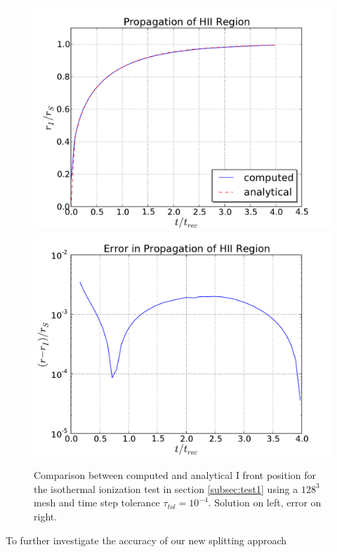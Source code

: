 \begin{figure}[t]
\centerline{\hfill
  \includegraphics[scale=0.45, trim=1.0cm 0.5cm 1.0cm 0.5cm]{i1-rad_vs_time.pdf}
  \includegraphics[scale=0.45, trim=1.0cm 0.5cm 1.0cm 0.5cm]{i1-rad_error_vs_time.pdf}
  \hfill}
  \caption{Comparison between computed and analytical I front position
    for the isothermal ionization test in section \ref{subsec:test1}
    using a $128^3$ mesh and time step tolerance $\tau_{tol}
    =10^{-4}$. Solution on left, error on right.} 
  \label{fig:i1_radius}
\end{figure}
To further investigate the accuracy of our new splitting approach
